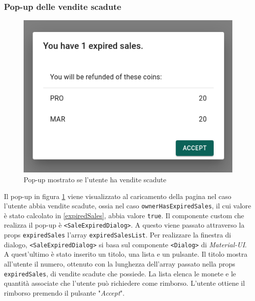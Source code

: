 \documentclass[a4paper]{article}
\begin{document}
        \subsubsection{Pop-up delle vendite scadute}
        \begin{figure}[H]
          \includegraphics[scale=0.5]{expiredSales.png}
          \centering
          \caption{Pop-up mostrato se l'utente ha vendite scadute}
          \centering
          \label{fig:Pop-up}
        \end{figure}
        Il pop-up in figura \ref{fig:Pop-up} viene visualizzato al caricamento della pagina nel caso l'utente abbia vendite scadute, ossia nel caso \verb|ownerHasExpiredSales|, il cui valore è stato calcolato in  \ref{expiredSales}, abbia valore \verb|true|.
        Il componente custom che realizza il pop-up è \verb|<SaleExpiredDialog>|. A questo viene passato attraverso la props \verb|expiredSales| l'array \verb|expiredSalesList|. Per realizzare la finestra di dialogo, \verb|<SaleExpiredDialog>| si basa sul componente
        \verb|<Dialog>| di \emph{Material-UI}. A quest'ultimo è stato inserito un titolo, una lista e un pulsante. Il titolo mostra all'utente il numero, ottenuto con la lunghezza dell'array passato nella props \verb|expiredSales|, di vendite scadute che possiede.
        La lista elenca le monete e le quantità associate che l'utente può richiedere come rimborso. L'utente ottiene il rimborso premendo il pulsante "\emph{Accept}".
\end{document}
